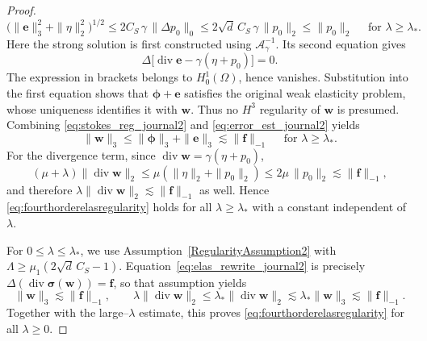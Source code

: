\documentclass[10pt]{amsart}
\renewcommand{\div}{\operatorname{div}}
\numberwithin{equation}{section}
\begin{document}
\begin{proof}
\begin{equation}
\big(\|\boldsymbol e\|_3^2+\|\eta\|_2^2\big)^{1/2}\le 2C_S\,\gamma\,\|\Delta p_0\|_0
\le 2\sqrt{d}\,C_S\,\gamma\,\|p_0\|_2\leq \|p_0\|_2\quad\textrm{ for }\lambda\ge\lambda_\ast.
\end{equation}
Here the strong solution is first constructed using $\mathcal A_\gamma^{-1}$. Its second equation gives
\[
\Delta\big[\div\boldsymbol e-\gamma(\eta+p_0)\big]=0.
\]
The expression in brackets belongs to $H_0^1(\Omega)$, hence vanishes. Substitution into the first equation shows that $\boldsymbol\phi+\boldsymbol e$ satisfies the original weak elasticity problem, whose uniqueness identifies it with $\boldsymbol w$. Thus no $H^3$ regularity of $\boldsymbol w$ is presumed.
Combining \eqref{eq:stokes_reg_journal2} and \eqref{eq:error_est_journal2} yields
\[
\|\boldsymbol w\|_3\le \|\boldsymbol\phi\|_3+\|\boldsymbol e\|_3
\lesssim\|\boldsymbol f\|_{-1}\quad\textrm{ for }\lambda\ge\lambda_\ast.
\]
For the divergence term, since $\operatorname{div}\boldsymbol w=\gamma(\eta+p_0)$,
\[
(\mu+\lambda)\|\operatorname{div}\boldsymbol w\|_2
\le \mu(\|\eta\|_2+\|p_0\|_2)
\le 2\mu\,\|p_0\|_2\lesssim \|\boldsymbol f\|_{-1},
\]
and therefore $\lambda\|\operatorname{div}\boldsymbol w\|_2\lesssim \|\boldsymbol f\|_{-1}$ as well.
Hence \eqref{eq:fourthorderelasregularity} holds for all $\lambda\ge\lambda_\ast$ with a constant independent of $\lambda$.

For $0\le\lambda\le\lambda_\ast$, we use Assumption~\ref{RegularityAssumption2} with $\Lambda\geq\mu_1(2\sqrt d\,C_S-1)$. Equation~\eqref{eq:elas_rewrite_journal2} is precisely $\Delta(\div\boldsymbol\sigma(\boldsymbol w))=\boldsymbol f$, so that assumption yields
\[
\|\boldsymbol w\|_3\lesssim \|\boldsymbol f\|_{-1},
\qquad
\lambda\|\operatorname{div}\boldsymbol w\|_2\le \lambda_\ast\|\operatorname{div}\boldsymbol w\|_2
\lesssim \lambda_\ast\|\boldsymbol w\|_3\lesssim \|\boldsymbol f\|_{-1}.
\]
Together with the large--$\lambda$ estimate, this proves \eqref{eq:fourthorderelasregularity} for all $\lambda\ge0$.
\end{proof}
\end{document}
